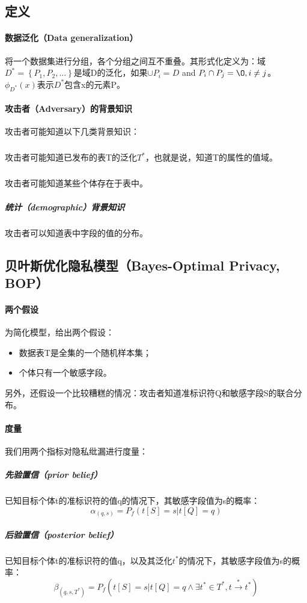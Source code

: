 \documentclass[12pt,a4paper]{article}
\begin{document}
\subsection{定义}
\paragraph{数据泛化（Data generalization）} 将一个数据集进行分组，各个分组之间互不重叠。其形式化定义为：域$D^*=\left \{P_1,P_2,...\right \}$是域D的泛化，如果$\cup P_i = D$ and $P_i \cap P_j = \O, i \neq j $。$\phi_{D^*}(x)$表示$D^*$包含x的元素P。

\paragraph{攻击者（Adversary）的背景知识} 攻击者可能知道以下几类背景知识：
	\subparagraph{} 攻击者可能知道已发布的表T的泛化$T^*$，也就是说，知道T的属性的值域。
	\subparagraph{} 攻击者可能知道某些个体存在于表中。
	\subparagraph{统计（demographic）背景知识} 攻击者可以知道表中字段的值的分布。

\subsection{贝叶斯优化隐私模型（Bayes-Optimal Privacy, BOP）}
\paragraph{两个假设} 为简化模型，给出两个假设：
\begin{itemize}
	\item 数据表T是全集的一个随机样本集；
	\item 个体只有一个敏感字段。
\end{itemize}
另外，还假设一个比较糟糕的情况：攻击者知道准标识符Q和敏感字段S的联合分布。
\paragraph{度量} 我们用两个指标对隐私纰漏进行度量：
	\subparagraph{先验置信（prior belief）} 已知目标个体t的准标识符的值q的情况下，其敏感字段值为s的概率：
	\begin{equation}
		\alpha_{(q,s)} = P_f(t[S]=s|t[Q]=q)
	\end{equation}

	\subparagraph{后验置信（posterior belief）} 已知目标个体t的准标识符的值q，以及其泛化$t^*$的情况下，其敏感字段值为s的概率：
	\begin{equation}
		\beta_{(q,s,T^*)}=P_f(t[S]=s|t[Q]=q \wedge \exists t^* \in T^*, t \overset{*}{\rightarrow}t^* )
	\end{equation}
\end{document}
